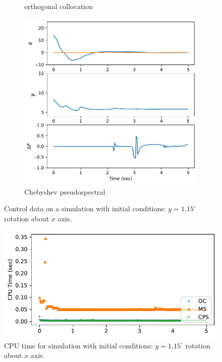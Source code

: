 \documentclass[]{article}
\begin{document}
\begin{figure}[H]
\begin{subfigure}[b]{0.3\textwidth}
		\caption{orthogonal collocation}
	\end{subfigure}%
	\begin{subfigure}[b]{0.3\textwidth}
		\centering
		\includegraphics[width=\textwidth]{figures/controly115dx5.pdf}
		\caption{Chebyshev pseudospectral}
	\end{subfigure}
	\caption{Control data on a simulation with initial conditions: $y = 1$,$15^{\circ}$ rotation about $x$ axis.}
	\label{fig:controly115dx}
\end{figure}


\begin{figure}[H]
	\centering
	\includegraphics[width=\textwidth]{figures/timey115dx.pdf}
	\caption{CPU time for simulation with initial conditions: $y = 1$,$15^{\circ}$ rotation about $x$ axis.}
	\label{fig:timey115dx}
\end{figure}
\end{document}
